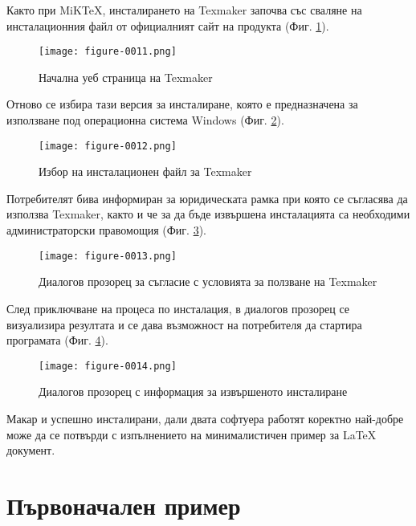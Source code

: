 Както при MiKTeX, инсталирането на Texmaker започва със сваляне на инсталационния файл от официалният сайт на продукта (Фиг. \ref{figure-0011}).

\begin{figure}
  \centering
  \texttt{[image: figure-0011.png]}
  \caption{Начална уеб страница на Texmaker}
\label{figure-0011}
\end{figure}

Отново се избира тази версия за инсталиране, която е предназначена за използване под операционна система Windows (Фиг. \ref{figure-0012}).

\begin{figure}
  \centering
  \texttt{[image: figure-0012.png]}
  \caption{Избор на инсталационен файл за Texmaker}
\label{figure-0012}
\end{figure}

Потребителят бива информиран за юридическата рамка при която се съгласява да използва Texmaker, както и че за да бъде извършена инсталацията са необходими администраторски правомощия (Фиг. \ref{figure-0013}).

\begin{figure}
  \centering
  \texttt{[image: figure-0013.png]}
  \caption{Диалогов прозорец за съгласие с условията за ползване на Texmaker}
\label{figure-0013}
\end{figure}

След приключване на процеса по инсталация, в диалогов прозорец се визуализира резултата и се дава възможност на потребителя да стартира програмата (Фиг. \ref{figure-0014}).

\begin{figure}
  \centering
  \texttt{[image: figure-0014.png]}
  \caption{Диалогов прозорец с информация за извършеното инсталиране}
\label{figure-0014}
\end{figure}

Макар и успешно инсталирани, дали двата софтуера работят коректно най-добре може да се потвърди с изпълнението на минималистичен пример за LaTeX документ.

\section{Първоначален пример}



